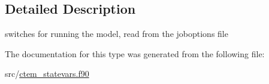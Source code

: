 \subsection{Detailed Description}
switches for running the model, read from the joboptions file 

The documentation for this type was generated from the following file\+:\begin{DoxyCompactItemize}
\item 
src/\hyperlink{ctem__statevars_8f90}{ctem\+\_\+statevars.\+f90}\end{DoxyCompactItemize}
